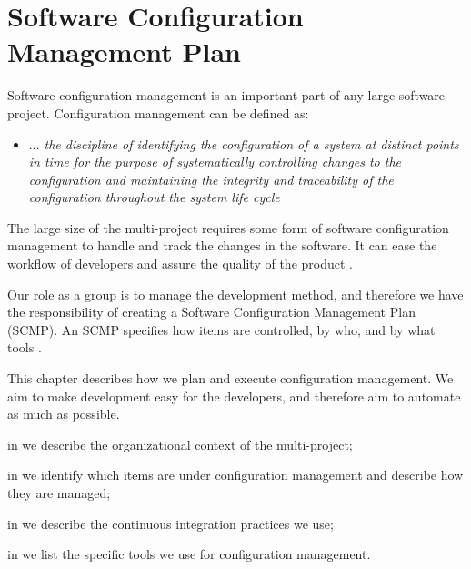 \chapter{Software Configuration Management Plan}\label{chap:sw_intro_cm}
Software configuration management is an important part of any large software project. Configuration management can be defined as:

\begin{itemize}
  \item []\emph{$\ldots{}$ the discipline of identifying the configuration of a system at distinct points in time for the purpose of systematically controlling changes to the configuration and maintaining the integrity and traceability of the configuration throughout the system life cycle} \parencite[ch.6, p.6-1]{swebok}
\end{itemize}

The large size of the multi-project requires some form of software configuration management to handle and track the changes in the software. It can ease the workflow of developers and assure the quality of the product \parencite[ch.6]{swebok}.

Our role as a group is to manage the development method, and therefore we have the responsibility of creating a Software Configuration Management Plan (SCMP). An SCMP specifies how items are controlled, by who, and by what tools \parencite[ch.6]{swebok}.

This chapter describes how we plan and execute configuration management. We aim to make development easy for the developers, and therefore aim to automate as much as possible.

\begin{chapterorganization}
  \item in  we describe the organizational context of the multi-project;
  \item in  we identify which items are under configuration management and describe how they are managed;
  \item in  we describe the continuous integration practices we use;
  \item in  we list the specific tools we use for configuration management.
\end{chapterorganization}

